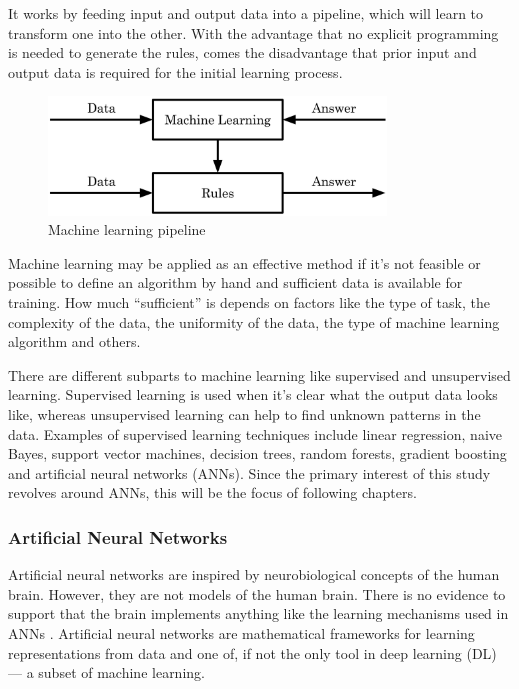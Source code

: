 It works by feeding input and output data into a pipeline, which will learn to transform one into the other. With the advantage that no explicit programming is needed to generate the rules, comes the disadvantage that prior input and output data is required for the initial learning process.

\begin{figure}[H]
\centering
\par
\includegraphics[width=0.8\textwidth]{imgs/ml_pipeline.png}
\caption{Machine learning pipeline}
\par
\end{figure}

Machine learning may be applied as an effective method if it's not feasible or possible to define an algorithm by hand and sufficient data is available for training. How much “sufficient” is depends on factors like the type of task, the complexity of the data, the uniformity of the data, the type of machine learning algorithm and others.

There are different subparts to machine learning like supervised and unsupervised learning. Supervised learning is used when it's clear what the output data looks like, whereas unsupervised learning can help to find unknown patterns in the data. Examples of supervised learning techniques include linear regression, naive Bayes, support vector machines, decision trees, random forests, gradient boosting and artificial neural networks (ANNs). Since the primary interest of this study revolves around ANNs, this will be the focus of following chapters.

\subsubsection{Artificial Neural Networks}

Artificial neural networks are inspired by neurobiological concepts of the human brain. However, they are not models of the human brain. There is no evidence to support that the brain implements anything like the learning mechanisms used in ANNs \cite{Chollet2017}. Artificial neural networks are mathematical frameworks for learning representations from data and one of, if not the only tool in deep learning (DL) --- a subset of machine learning.

